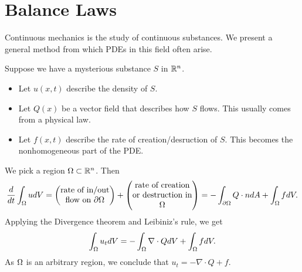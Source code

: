 \section{Balance Laws}
Continuous mechanics is the study of continuous substances. We present a general method from which PDEs in this field often arise.

Suppose we have a mysterious substance $S$ in ${\mathbb R}^n$.
\begin{itemize}
    \item Let $u(x,t)$ describe the density of $S$.
    \item Let $Q(x)$ be a vector field that describes how $S$ flows. This usually comes from a physical law.
    \item Let $f(x,t)$ describe the rate of creation/desruction of $S$. This becomes the nonhomogeneous part of the PDE.
\end{itemize}
We pick a region $\Omega \subset {\mathbb R}^n$. Then
\[
    \frac{d}{dt}\int_\Omega udV =
    \begin{pmatrix}
        \text{rate of in/out}\\
        \text{flow on $\partial \Omega$}
    \end{pmatrix}
    +
    \begin{pmatrix}
        \text{rate of creation}\\
        \text{or destruction in}\\
        \text{$\Omega$}
    \end{pmatrix}
    =
    - \int_{\partial \Omega} Q \cdot n dA
    +
    \int_\Omega f dV.
\]
Applying the Divergence theorem and Leibiniz's rule, we get
\[
    \int_\Omega u_tdV = -\int_\Omega \nabla \cdot Q dV + \int_\Omega fdV.
\]
As $\Omega$ is an arbitrary region, we conclude that $u_t = -\nabla \cdot Q + f$.
